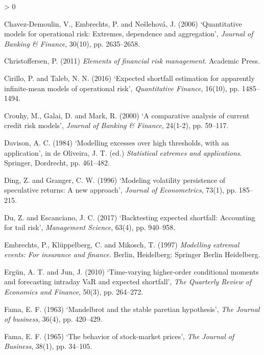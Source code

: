 \documentclass[a4paper,11pt]{article}
\newlength{\cslhangindent}
\newenvironment{CSLReferences}[2] %
 {%
  \setlength{\parindent}{0pt}
  \ifodd #1 \everypar{\setlength{\hangindent}{\cslhangindent}}\ignorespaces\fi
  \ifnum #2 > 0
  \setlength{\parskip}{#2\baselineskip}
  \fi
 }%
 {}
\theoremstyle{definition}
\theoremstyle{definition}
\theoremstyle{definition}
\theoremstyle{definition}
\theoremstyle{remark}
\begin{document}
\begin{CSLReferences}{0}{0}
\leavevmode\hypertarget{ref-chavez2006quantitative}{}%
Chavez-Demoulin, V., Embrechts, P. and Nešlehová, J. (2006) {`Quantitative models for operational risk: Extremes, dependence and aggregation'}, \emph{Journal of Banking \& Finance}, 30(10), pp. 2635--2658.

\leavevmode\hypertarget{ref-christoffersen2011elements}{}%
Christoffersen, P. (2011) \emph{Elements of financial risk management}. Academic Press.

\leavevmode\hypertarget{ref-cirillo2016expected}{}%
Cirillo, P. and Taleb, N. N. (2016) {`Expected shortfall estimation for apparently infinite-mean models of operational risk'}, \emph{Quantitative Finance}, 16(10), pp. 1485--1494.

\leavevmode\hypertarget{ref-crouhy2000comparative}{}%
Crouhy, M., Galai, D. and Mark, R. (2000) {`A comparative analysis of current credit risk models'}, \emph{Journal of Banking \& Finance}, 24(1-2), pp. 59--117.

\leavevmode\hypertarget{ref-davison1984}{}%
Davison, A. C. (1984) {`Modelling excesses over high thresholds, with an application'}, in de Oliveira, J. T. (ed.) \emph{Statistical extremes and applications}. Springer, Dordrecht, pp. 461--482.

\leavevmode\hypertarget{ref-ding1996modeling}{}%
Ding, Z. and Granger, C. W. (1996) {`Modeling volatility persistence of speculative returns: A new approach'}, \emph{Journal of Econometrics}, 73(1), pp. 185--215.

\leavevmode\hypertarget{ref-du2017backtesting}{}%
Du, Z. and Escanciano, J. C. (2017) {`Backtesting expected shortfall: Accounting for tail risk'}, \emph{Management Science}, 63(4), pp. 940--958.

\leavevmode\hypertarget{ref-embrechts1997modelling}{}%
Embrechts, P., Klüppelberg, C. and Mikosch, T. (1997) \emph{Modelling extremal events: For insurance and finance}. Berlin, Heidelberg: Springer Berlin Heidelberg.

\leavevmode\hypertarget{ref-ergun2010time}{}%
Ergün, A. T. and Jun, J. (2010) {`Time-varying higher-order conditional moments and forecasting intraday VaR and expected shortfall'}, \emph{The Quarterly Review of Economics and Finance}, 50(3), pp. 264--272.

\leavevmode\hypertarget{ref-fama1963}{}%
Fama, E. F. (1963) {`Mandelbrot and the stable paretian hypothesis'}, \emph{The Journal of business}, 36(4), pp. 420--429.

\leavevmode\hypertarget{ref-fama1965}{}%
Fama, E. F. (1965) {`The behavior of stock-market prices'}, \emph{The Journal of Business}, 38(1), pp. 34--105.


\end{CSLReferences}
\end{document}
